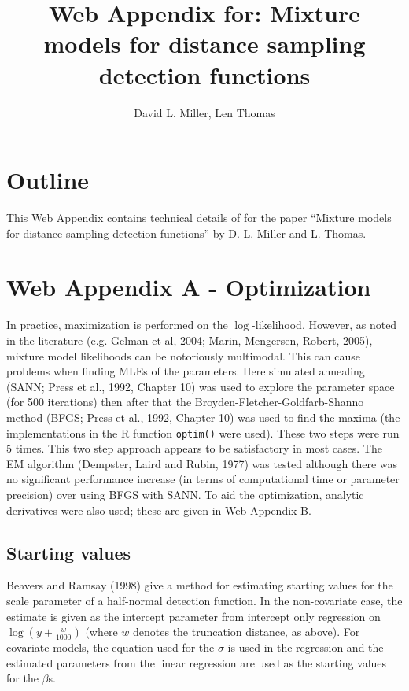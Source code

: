 \documentclass{report}
\begin{document}
\title{Web Appendix for: Mixture models for distance sampling detection functions}

\author{David L. Miller, Len Thomas}

\maketitle

\section*{Outline}

This Web Appendix contains technical details of for the paper ``Mixture models for distance sampling detection functions'' by D. L. Miller and L. Thomas.

\section*{Web Appendix A - Optimization}
\label{s:optimization}

In practice, maximization is performed on the $\log$-likelihood. However, as noted in the literature (e.g. Gelman et al, 2004; Marin, Mengersen, Robert, 2005), mixture model likelihoods can be notoriously multimodal. This can cause problems when finding MLEs of the parameters. Here simulated annealing (SANN; Press et al., 1992, Chapter 10) was used to explore the parameter space (for 500 iterations) then after that the Broyden-Fletcher-Goldfarb-Shanno method (BFGS; Press et al., 1992, Chapter 10) was used to find the maxima (the implementations in the \textsf{R} function \texttt{optim()} were used). These two steps were run 5 times. This two step approach appears to be satisfactory in most cases. The EM algorithm (Dempster, Laird and Rubin, 1977) was tested although there was no significant performance increase (in terms of computational time or parameter precision) over using BFGS with SANN. To aid the optimization, analytic derivatives were also used; these are given in Web Appendix B.

\subsection*{Starting values}
Beavers and Ramsay (1998) give a method for estimating starting values for the scale parameter of a half-normal detection function. In the non-covariate case, the estimate is given as the intercept parameter from intercept only regression on $\log(y+\frac{w}{1000})$ (where $w$ denotes the truncation distance, as above). For covariate models, the equation used for the $\sigma$ is used in the regression and the estimated parameters from the linear regression are used as the starting values for the $\beta$s.
\end{document}
